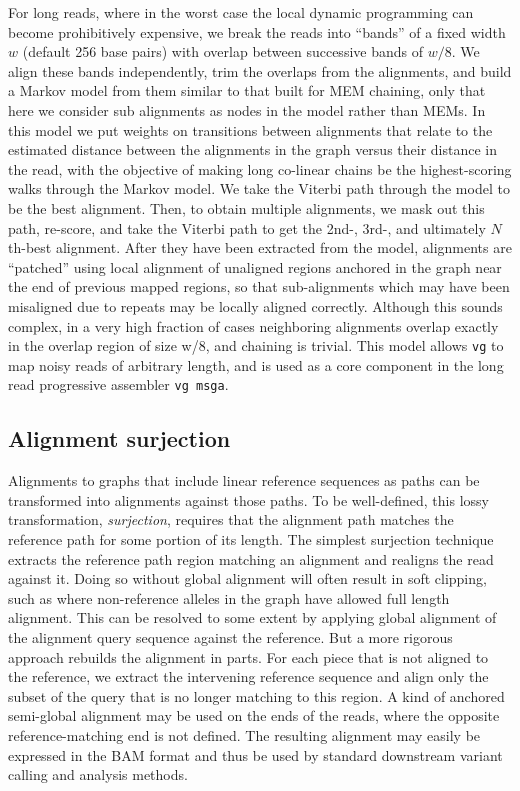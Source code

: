 For long reads, where in the worst case the local dynamic programming can become prohibitively expensive, we break the reads into ``bands'' of a fixed width $w$ (default 256 base pairs) with overlap between successive bands of $w/8$.
We align these bands independently, trim the overlaps from the alignments, and build a Markov model from them similar to that built for MEM chaining, only that here we consider sub alignments as nodes in the model rather than MEMs.
In this model we put weights on transitions between alignments that relate to the estimated distance between the alignments in the graph versus their distance in the read, with the objective of making long co-linear chains be the highest-scoring walks through the Markov model.
We take the Viterbi path through the model to be the best alignment.
Then, to obtain multiple alignments, we mask out this path, re-score, and take the Viterbi path to get the 2nd-, 3rd-, and ultimately $N$th-best alignment.
After they have been extracted from the model, alignments are ``patched'' using local alignment of unaligned regions anchored in the graph near the end of previous mapped regions, so that sub-alignments which may have been misaligned due to repeats may be locally aligned correctly.
Although this sounds complex, in a very high fraction of cases neighboring alignments overlap exactly in the overlap region of size w/8, and chaining is trivial.
This model allows {\tt vg} to map noisy reads of arbitrary length, and is used as a core component in the long read progressive assembler {\tt vg msga}.


\subsection{Alignment surjection}

Alignments to graphs that include linear reference sequences as paths can be transformed into alignments against those paths.
To be well-defined, this lossy transformation, \emph{surjection}, requires that the alignment path matches the reference path for some portion of its length.
The simplest surjection technique extracts the reference path region matching an alignment and realigns the read against it.
Doing so without global alignment will often result in soft clipping, such as where non-reference alleles in the graph have allowed full length alignment.
This can be resolved to some extent by applying global alignment of the alignment query sequence against the reference.
But a more rigorous approach rebuilds the alignment in parts.
For each piece that is not aligned to the reference, we extract the intervening reference sequence and align only the subset of the query that is no longer matching to this region.
A kind of anchored semi-global alignment may be used on the ends of the reads, where the opposite reference-matching end is not defined.
The resulting alignment may easily be expressed in the BAM format and thus be used by standard downstream variant calling and analysis methods.

